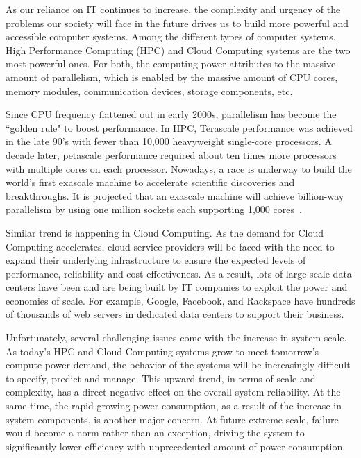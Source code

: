 As our reliance on IT continues to increase, the complexity and urgency of the problems our society will face 
in the future drives us to build more powerful and accessible computer systems. Among the different types of 
computer systems, High Performance Computing (HPC) and Cloud Computing systems are the two most powerful ones. 
For both, the computing power attributes to the massive amount of parallelism, which is enabled by 
the massive amount of CPU cores, memory modules, communication devices, storage components, etc. 

Since CPU frequency flattened out in early 2000s, parallelism has become the ``golden rule" to boost performance. 
In HPC, Terascale performance was achieved in the late 90’s with fewer than 10,000 heavyweight single-core processors. 
A decade later, petascale performance required about ten times more processors with multiple cores on each processor. Nowadays, a race
is underway to build the world's first exascale machine to accelerate scientific discoveries and breakthroughs. It is 
projected that an exascale machine will achieve billion-way parallelism by using one million sockets each supporting 
1,000 cores~\cite{doe_ascr_exascale_2011,top_ten_2014}. 

Similar trend is happening in Cloud Computing. 
As the demand for Cloud Computing accelerates, cloud service providers  
will be faced with the need to expand their underlying infrastructure to ensure the expected levels of performance, reliability and cost-effectiveness. 
As a result, lots of large-scale data centers have been and are being built by IT companies
to exploit the power and economies of scale. 
For example, Google, Facebook, and Rackspace have hundreds of thousands 
of web servers in dedicated data centers to support their business. 

Unfortunately, several challenging issues come with the increase in system scale. As today's HPC and Cloud Computing systems grow to 
meet tomorrow's compute power demand, the behavior of the systems will be increasingly difficult to specify, predict and manage. 
This upward trend, in terms of scale and complexity, has a direct negative effect on the overall system reliability. 
At the same time, the rapid 
growing power consumption, as a result of the increase in system components, is another major concern. 
At future extreme-scale, failure would become a norm rather than an exception, 
driving the system to significantly lower efficiency with unprecedented amount of power consumption. 

